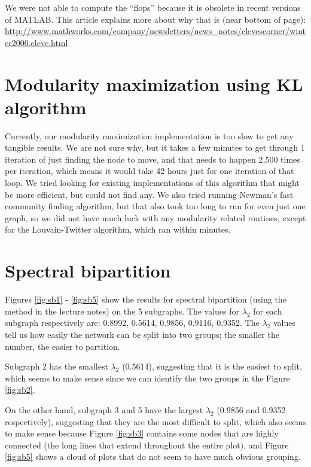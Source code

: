 \documentclass[11pt]{article}
\begin{document}
We were not able to compute the ``flops'' because it is obsolete in recent versions of MATLAB. This article explains more about why that is (near bottom of page): \url{http://www.mathworks.com/company/newsletters/news_notes/clevescorner/winter2000.cleve.html}

\section{Modularity maximization using KL algorithm}
Currently, our modularity maximization implementation is too slow to get any tangible results. We are not sure why, but it takes a few minutes to get through 1 iteration of just finding the node to move, and that needs to happen 2,500 times per iteration, which means it would take 42 hours just for one iteration of that loop. We tried looking for existing implementations of this algorithm that might be more efficient, but could not find any. We also tried running Newman's fast community finding algorithm, but that also took too long to run for even just one graph, so we did not have much luck with any modularity related routines, except for the Louvain-Twitter algorithm, which ran within minutes.

\section{Spectral bipartition}
Figures \ref{fig:sb1} - \ref{fig:sb5} show the results for spectral bipartition (using the method in the lecture notes) on the 5 subgraphs. The values for $\lambda_2$ for each subgraph respectively are: 0.8992, 0.5614, 0.9856, 0.9116, 0.9352. The $\lambda_2$ values tell us how easily the network can be split into two groups; the smaller the number, the easier to partition.

Subgraph 2 has the smallest $\lambda_2$ (0.5614), suggesting that it is the easiest to split, which seems to make sense since we can identify the two groups in the Figure \ref{fig:sb2}.

On the other hand, subgraph 3 and 5 have the largest $\lambda_2$ (0.9856 and 0.9352 respectively), suggesting that they are the most difficult to split, which also seems to make sense because Figure \ref{fig:sb3} contains some nodes that are highly connected (the long lines that extend throughout the entire plot), and Figure \ref{fig:sb5} shows a cloud of plots that do not seem to have much obvious grouping.
\end{document}
